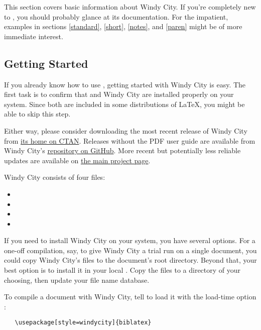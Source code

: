 \documentclass[11pt,letterpaper,oneside]{article}
\begin{document}
This section covers basic information about Windy City. If you're
completely new to \biblatex, you should probably glance at its
documentation. For the impatient, examples in sections \ref{standard},
\ref{short}, \ref{notes}, and \ref{paren} might be of more immediate
interest.

\subsection{Getting Started}

If you already know how to use \biblatex, getting started with Windy
City is easy. The first task is to confirm that \biblatex and Windy
City are installed properly on your system. Since both are included in
some distributions of \LaTeX, you might be able to skip this step.

Either way, please consider downloading the most recent release of
Windy City from \begingroup \hypersetup{urlcolor=blue}
\href{https://www.ctan.org/pkg/windycity}{its home on CTAN}. Releases
without the PDF user guide are available from Windy City's
\href{https://github.com/brianchase/windycity/releases}{repository on
GitHub}. More recent but potentially less reliable updates are
available on \href{https://github.com/brianchase/windycity}{the main
project page}.\endgroup

Windy City consists of four files:

\begin{itemize}[before=\small]
\item {}
\item {}
\item {}
\item {}
\end{itemize}

If you need to install Windy City on your system, you have several
options. For a one-off compilation, say, to give Windy City a trial
run on a single document, you could copy Windy City's files to the
document's root directory. Beyond that, your best option is to install
it in your local . Copy the files to a directory of your
choosing, then update your  file name database.

To compile a document with Windy City, tell \biblatex to load it with
the load-time option :

\begin{verbatim}
   \usepackage[style=windycity]{biblatex}
\end{verbatim}
\end{document}
